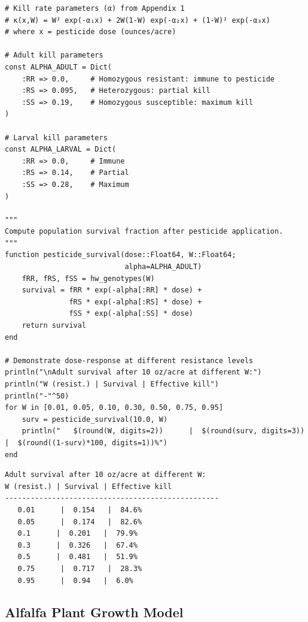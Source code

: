 \begin{verbatim}
# Kill rate parameters (α) from Appendix 1
# κ(x,W) = W² exp(-α₁x) + 2W(1-W) exp(-α₂x) + (1-W)² exp(-α₃x)
# where x = pesticide dose (ounces/acre)

# Adult kill parameters
const ALPHA_ADULT = Dict(
    :RR => 0.0,     # Homozygous resistant: immune to pesticide
    :RS => 0.095,   # Heterozygous: partial kill
    :SS => 0.19,    # Homozygous susceptible: maximum kill
)

# Larval kill parameters
const ALPHA_LARVAL = Dict(
    :RR => 0.0,     # Immune
    :RS => 0.14,    # Partial
    :SS => 0.28,    # Maximum
)

"""
Compute population survival fraction after pesticide application.
"""
function pesticide_survival(dose::Float64, W::Float64;
                            alpha=ALPHA_ADULT)
    fRR, fRS, fSS = hw_genotypes(W)
    survival = fRR * exp(-alpha[:RR] * dose) +
               fRS * exp(-alpha[:RS] * dose) +
               fSS * exp(-alpha[:SS] * dose)
    return survival
end

# Demonstrate dose-response at different resistance levels
println("\nAdult survival after 10 oz/acre at different W:")
println("W (resist.) | Survival | Effective kill")
println("-"^50)
for W in [0.01, 0.05, 0.10, 0.30, 0.50, 0.75, 0.95]
    surv = pesticide_survival(10.0, W)
    println("   $(round(W, digits=2))      |  $(round(surv, digits=3))   |  $(round((1-surv)*100, digits=1))%")
end
\end{verbatim}




\begin{verbatim}
Adult survival after 10 oz/acre at different W:
W (resist.) | Survival | Effective kill
--------------------------------------------------
   0.01      |  0.154   |  84.6%
   0.05      |  0.174   |  82.6%
   0.1      |  0.201   |  79.9%
   0.3      |  0.326   |  67.4%
   0.5      |  0.481   |  51.9%
   0.75      |  0.717   |  28.3%
   0.95      |  0.94   |  6.0%
\end{verbatim}



\subsection{Alfalfa Plant Growth Model}



\label{11370362308938860408}{}



